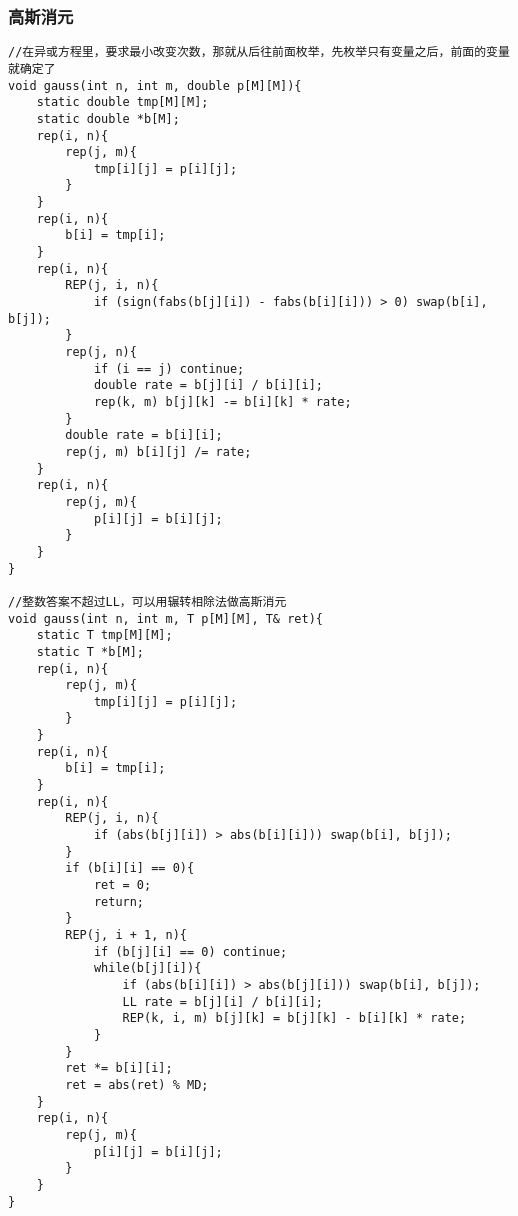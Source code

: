 \subsubsection{高斯消元}
\begin{verbatim}
//在异或方程里，要求最小改变次数，那就从后往前面枚举，先枚举只有变量之后，前面的变量就确定了
void gauss(int n, int m, double p[M][M]){
	static double tmp[M][M];
	static double *b[M];
	rep(i, n){
		rep(j, m){
			tmp[i][j] = p[i][j];
		}
	}
	rep(i, n){
		b[i] = tmp[i];
	}
	rep(i, n){
		REP(j, i, n){
			if (sign(fabs(b[j][i]) - fabs(b[i][i])) > 0) swap(b[i], b[j]);
		}
		rep(j, n){
			if (i == j) continue;
			double rate = b[j][i] / b[i][i];
			rep(k, m) b[j][k] -= b[i][k] * rate;
		}
		double rate = b[i][i];
		rep(j, m) b[i][j] /= rate;
	}
	rep(i, n){
		rep(j, m){
			p[i][j] = b[i][j];
		}
	}
}

//整数答案不超过LL，可以用辗转相除法做高斯消元
void gauss(int n, int m, T p[M][M], T& ret){
	static T tmp[M][M];
	static T *b[M];
	rep(i, n){
		rep(j, m){
			tmp[i][j] = p[i][j];
		}
	}
	rep(i, n){
		b[i] = tmp[i];
	}
	rep(i, n){
		REP(j, i, n){
			if (abs(b[j][i]) > abs(b[i][i])) swap(b[i], b[j]);
		}
		if (b[i][i] == 0){
			ret = 0;
			return;
		}
		REP(j, i + 1, n){
			if (b[j][i] == 0) continue;
			while(b[j][i]){
				if (abs(b[i][i]) > abs(b[j][i])) swap(b[i], b[j]);
				LL rate = b[j][i] / b[i][i];
				REP(k, i, m) b[j][k] = b[j][k] - b[i][k] * rate;
			}
		}
		ret *= b[i][i];
		ret = abs(ret) % MD;
	}
	rep(i, n){
		rep(j, m){
			p[i][j] = b[i][j];
		}
	}
}
\end{verbatim}
